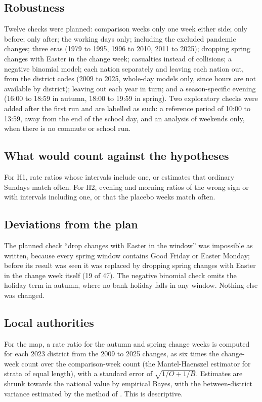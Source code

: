 \documentclass[11pt,a4paper]{article}
\begin{document}
\subsection{Robustness}
Twelve checks were planned: comparison weeks only one week either side; only before; only after; the working days only; including the excluded pandemic changes; three eras (1979 to 1995, 1996 to 2010, 2011 to 2025); dropping spring changes with Easter in the change week; casualties instead of collisions; a negative binomial model; each nation separately and leaving each nation out, from the district codes (2009 to 2025, whole-day models only, since hours are not available by district); leaving out each year in turn; and a season-specific evening (16:00 to 18:59 in autumn, 18:00 to 19:59 in spring). Two exploratory checks were added after the first run and are labelled as such: a reference period of 10:00 to 13:59, away from the end of the school day, and an analysis of weekends only, when there is no commute or school run.

\subsection{What would count against the hypotheses}
For H1, rate ratios whose intervals include one, or estimates that ordinary Sundays match often. For H2, evening and morning ratios of the wrong sign or with intervals including one, or that the placebo weeks match often.

\subsection{Deviations from the plan}\label{sec:dev}
The planned check ``drop changes with Easter in the window'' was impossible as written, because every spring window contains Good Friday or Easter Monday; before its result was seen it was replaced by dropping spring changes with Easter in the change week itself (19 of 47). The negative binomial check omits the holiday term in autumn, where no bank holiday falls in any window. Nothing else was changed.

\subsection{Local authorities}
For the map, a rate ratio for the autumn and spring change weeks is computed for each 2023 district from the 2009 to 2025 changes, as six times the change-week count over the comparison-week count (the Mantel-Haenszel estimator for strata of equal length), with a standard error of $\sqrt{1/O + 1/B}$. Estimates are shrunk towards the national value by empirical Bayes, with the between-district variance estimated by the method of \citet{dersimonian1986}. This is descriptive.
\end{document}
